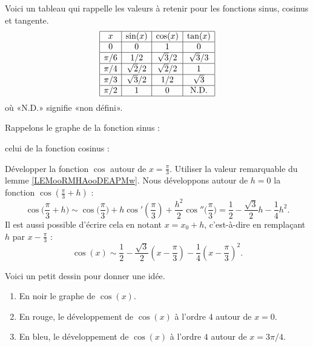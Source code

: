 Voici un tableau qui rappelle les valeurs à retenir pour les fonctions sinus, cosinus et tangente.
\begin{equation}\label{PGooIMQFooTnBdIl}
	\begin{array}[]{|c|c|c|c|}
		\hline
		x     & \sin(x)    & \cos(x)    & \tan(x)     \\
		\hline
		0     & 0          & 1          & 0           \\
		\hline
		\pi/6 & 1/2        & \sqrt{3}/2 & \sqrt{3}/3  \\
		\hline
		\pi/4 & \sqrt{2}/2 & \sqrt{2}/2 & 1           \\
		\hline
		\pi/3 & \sqrt{3}/2 & 1/2        & \sqrt{3}    \\
		\hline
		\pi/2 & 1          & 0          & \text{N.D.} \\
		\hline
	\end{array}
\end{equation}
où «N.D.»  signifie «non défini».

Rappelons le graphe de la fonction sinus :
\begin{center}
	
\end{center}
celui de la fonction cosinus :
\begin{center}
	
\end{center}



\begin{example}     \label{developcosenpisur3}
	Développer la fonction \( \cos\) autour de \( x=\frac{ \pi }{ 3 }\). Utiliser la valeur remarquable du lemme \ref{LEMooRMHAooDEAPMw}. Nous développons autour de \( h=0\) la fonction \( \cos(\frac{ \pi }{ 3 }+h)\) :
	\begin{equation}
		\cos\big( \frac{ \pi }{ 3 }+h \big)\sim \cos\big( \frac{ \pi }{ 3 } \big)+h\cos'(\frac{ \pi }{ 3 })+\frac{ h^2 }{2}\cos''\big( \frac{ \pi }{ 3 } \big)=\frac{ 1 }{2}-\frac{ \sqrt{3} }{2}h-\frac{1}{ 4 }h^2.
	\end{equation}
	Il est aussi possible d'écrire cela en notant \( x=x_0+h\), c'est-à-dire en remplaçant \( h\) par \( x-\frac{ \pi }{ 3 }\) :
	\begin{equation}
		\cos(x)\sim\frac{ 1 }{2}-\frac{ \sqrt{3} }{ 2 }(x-\frac{ \pi }{ 3 })-\frac{1}{ 4 }(x-\frac{ \pi }{ 3 })^2.
	\end{equation}
\end{example}

\begin{normaltext}
	Voici un petit dessin pour donner une idée.
	\begin{center}
		
	\end{center}
	\begin{enumerate}
		\item
		      En noir le graphe de \( \cos(x)\).
		\item
		      En rouge, le développement de \( \cos(x)\) à l'ordre \( 4\) autour de \( x=0\).
		\item
		      En bleu, le développement de \( \cos(x)\) à l'ordre \( 4\) autour de \( x=3\pi/4\).
	\end{enumerate}
\end{normaltext}
